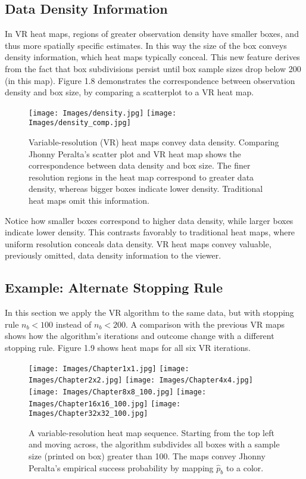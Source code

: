 \subsection{Data Density Information}

In VR heat maps, regions of greater observation density have smaller boxes, and thus more spatially specific estimates. In this way the size of the box conveys density information, which heat maps typically conceal. This new feature derives from the fact that box subdivisions persist until box sample sizes drop below 200 (in this map). Figure 1.8 demonstrates the correspondence between observation density and box size, by comparing a scatterplot to a VR heat map. 
        \begin{figure}[H]
      	\centering
      	\texttt{[image: Images/density.jpg]}
      	\texttt{[image: Images/density\_comp.jpg]} 
      	\caption{Variable-resolution (VR) heat maps convey data density. Comparing Jhonny Peralta's scatter plot and VR heat map shows the correspondence between data density and box size. The finer resolution regions in the heat map correspond to greater data density, whereas bigger boxes indicate lower density. Traditional heat maps omit this information.}
      	\end{figure}
Notice how smaller boxes correspond to higher data density, while larger boxes indicate lower density. This contrasts favorably to traditional heat maps, where uniform resolution conceals data density. VR heat maps convey valuable, previously omitted, data density information to the viewer. 
      	
\subsection{Example: Alternate Stopping Rule} %
      	
In this section we apply the VR algorithm to the same data, but with stopping rule $n_{b} < 100$ instead of $n_{b} < 200$. A comparison with the previous VR maps shows how the algorithm's iterations and outcome change with a different stopping rule. Figure 1.9 shows heat maps for all six VR iterations.
        \begin{figure}[H]
      	\centering
      	\texttt{[image: Images/Chapter1x1.jpg]}
      	\texttt{[image: Images/Chapter2x2.jpg]}
      	\texttt{[image: Images/Chapter4x4.jpg]}
      	\texttt{[image: Images/Chapter8x8\_100.jpg]}
      	\texttt{[image: Images/Chapter16x16\_100.jpg]}
      	\texttt{[image: Images/Chapter32x32\_100.jpg]}
      	\caption{A variable-resolution heat map sequence. Starting from the top left and moving across, the algorithm subdivides all boxes with a sample size (printed on box) greater than 100. The maps convey Jhonny Peralta's empirical success probability by mapping $\hat{p}_{b}$ to a color.}
\end{figure} 	

